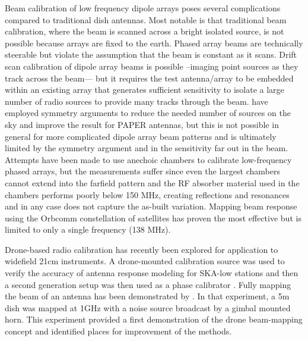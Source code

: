 \documentclass[preprint2,numberedappendix,tighten,twocolappendix]{aastex6}
\begin{document}
Beam calibration of low frequency dipole arrays poses several complications compared to traditional dish antennas. Most notable is that traditional beam calibration, where the beam is scanned across a bright isolated source, is not possible because arrays are fixed to the earth. Phased array beams are technically steerable but violate the assumption that the beam is constant as it scans. Drift scan calibration of dipole array beams is possible --imaging point sources as they track across the beam--- but it requires the test antenna/array to be embedded within an existing array that generates sufficient sensitivity to isolate a large number of radio sources to provide many tracks through the beam. \citet{Pober:2013p9942} have employed symmetry arguments to reduce the needed number of sources on the sky and improve the result for PAPER antennas, but this is not possible in general for more complicated dipole array beam patterns and is ultimately limited by the symmetry argument and in the sensitivity far out in the beam.  Attempts have been made to use anechoic chambers to calibrate low-frequency phased arrays, but the measurements suffer since even the largest chambers cannot extend into the farfield pattern and the RF absorber material used in the chambers performs poorly below 150 MHz, creating reflections and resonances and in any case does not capture the as-built variation. Mapping beam response using the Orbcomm constellation of satellites has proven the most effective \citep{2015RaSc...50..614N,2016:NebenHERAdish} but is limited to only a single frequency (138 MHz).  

Drone-based radio calibration has recently been explored for application to widefield 21cm instruments.  A drone-mounted calibration source was used to verify the accuracy of antenna response modeling for SKA-low stations \cite{2014IAWPL..13..169V} and then a second generation setup was then used as a phase calibrator \citep{2015ExA....39..405P}.  Fully mapping the beam of an antenna has been demonstrated by \citet{2015PASP..127.1131C}.  In that experiment, a 5m dish was mapped at 1GHz with a noise source broadcast by a gimbal mounted horn. This experiment provided a first demonstration of the drone beam-mapping concept and identified places for improvement of the methods. 
\end{document}
